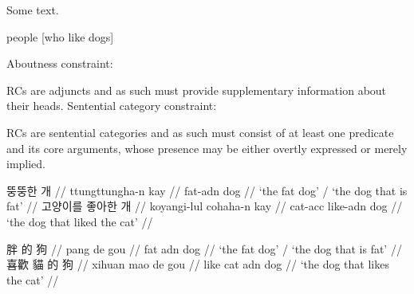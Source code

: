 \noindent Some text.

\ex
people [who like dogs] \label{ex-horse}
\xe

\pex \label{ex-constraint}
\a Aboutness constraint: \par\nobreak\vspace{5pt} RCs are adjuncts and as such must provide supplementary information about their heads.
\a Sentential category constraint: \par\nobreak\vspace{5pt} RCs are sentential categories and as such must consist of at least one predicate and its core arguments, whose presence may be either overtly expressed or merely implied.
\xe

\pex[everygla=\ko] \label{ex-dog-ko}
\a
\begingl
\gla 뚱뚱한 개 //
\glb ttungttungha-n kay //
\glc fat-{\sc adn} dog //
\glft `the fat dog' / `the dog that is fat' //
\endgl \label{ex-dog-ko-1}
\a
\begingl
\gla 고양이를 좋아한 개 //
\glb koyangi-lul cohaha-n kay //
\glc cat-{\sc acc} like-{\sc adn} dog //
\glft `the dog that liked the cat' //
\endgl \label{ex-dog-ko-2}
\xe

\pex[everygla=\zh] \label{ex-dog-zh}
\a
\begingl
\gla 胖 的 狗 //
\glb pang de gou //
\glc fat {\sc adn} dog //
\glft `the fat dog' / `the dog that is fat' //
\endgl \label{ex-dog-zh-1}
\a
\begingl
\gla 喜歡 貓 的 狗 //
\glb xihuan mao de gou //
\glc like cat {\sc adn} dog //
\glft `the dog that likes the cat' //
\endgl \label{ex-dog-zh-2}
\xe